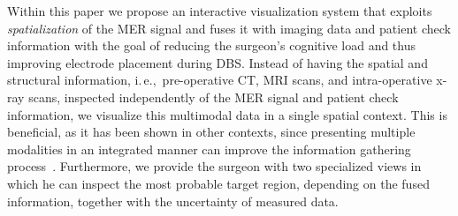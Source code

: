 \documentclass[review]{vgtc}                 %
\begin{document}
Within this paper we propose an interactive visualization system that exploits {\it spatialization} of the MER signal and fuses it with imaging data and patient check information with the goal of reducing the surgeon's cognitive load and thus improving electrode placement during DBS. Instead of having the spatial and structural information, i.\,e.,~pre-operative CT, MRI scans, and intra-operative x-ray scans, inspected independently of the MER signal and patient check information, we visualize this multimodal data in a single spatial context. This is beneficial, as it has been shown in other contexts, since presenting multiple modalities in an integrated manner can improve the information gathering process~\cite{10.1109/BIOMEDVIS.1995.10008}. Furthermore, we provide the surgeon with two specialized views in which he can inspect the most probable target region, depending on the fused information, together with the uncertainty of measured data.
%
%
%
%
%
\end{document}
